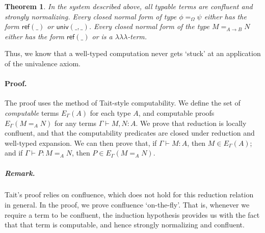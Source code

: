 \documentclass{easychair}
\newcommand{\triplelambda}{\lambda \!\! \lambda \!\! \lambda}
\newcommand{\reff}[1]{\mathsf{ref} \left( {#1} \right)}
\newtheorem{theorem}[lemma]{Theorem}
\begin{document}
\begin{theorem}
In the system described above, all typable terms are confluent and strongly normalizing.  Every closed normal form of type $\phi =_\Omega \psi$ either has the form $\reff{\_}$ or $\mathsf{univ}(\_,\_)$.  Every closed normal form of the type $M =_{A \rightarrow B} N$ either has the form $\reff{\_}$ or is a $\triplelambda$-term.
\end{theorem}

Thus, we know that a well-typed computation never gets `stuck' at an application of the univalence axiom.

\paragraph{Proof.}

The proof uses the method of Tait-style computability.
We define the set of \emph{computable} terms $E_\Gamma(A)$ for each type $A$,
and computable proofs $E_\Gamma(M =_A N)$ for any terms $\Gamma \vdash M,N : A$. We prove that reduction is locally confluent, and that the computability predicates are closed under reduction and well-typed expansion.  We can then prove that, if $\Gamma \vdash M : A$, then $M \in E_\Gamma(A)$; and if $\Gamma \vdash P : M =_A N$, then $P \in E_\Gamma(M =_A N)$. 

\subparagraph{Remark.} Tait's proof relies on confluence, which does not hold for this reduction relation in general.  In the proof, we prove confluence `on-the-fly'.  That is, whenever we require a term to be confluent, the induction hypothesis provides us with the fact that that term is computable, and hence strongly normalizing and confluent.


%
\end{document}
